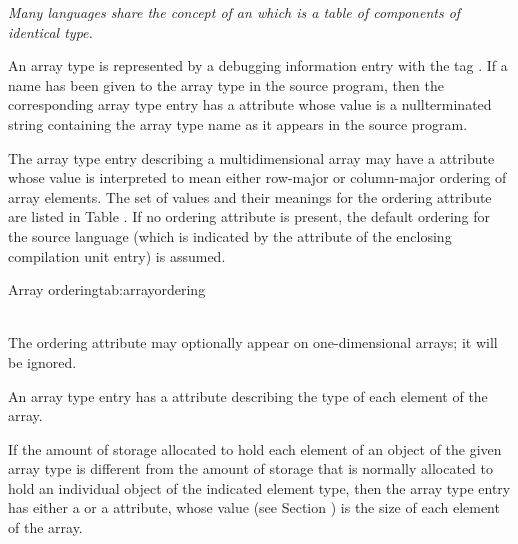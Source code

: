 \textit{Many languages share the concept of an  which is
a table of components of identical type.}

An array type is represented by a debugging information entry
with the tag \DWTAGarraytypeTARG. 
If a name has been given to
the array type in the source program, then the corresponding
array type entry has a \DWATname{} attribute 
whose value is a
null\dash terminated string containing the array type name as it
appears in the source program.

The 
\hypertarget{chap:DWATorderingarrayrowcolumnordering}{}
array type entry describing a multidimensional array may
have a \DWATordering{} attribute whose 
 value is
interpreted to mean either row-major or column-major ordering
of array elements. The set of values and their meanings
for the ordering attribute are listed in 
Table . 
If no
ordering attribute is present, the default ordering for the
source language (which is indicated by the 
\DWATlanguage{}
attribute 
of the enclosing compilation unit entry) is assumed.

\begin{simplenametable}[1.8in]{Array ordering}{tab:arrayordering}
\DWORDcolmajorTARG{} \\
\DWORDrowmajorTARG{} \\
\end{simplenametable}

The ordering attribute may optionally appear on one-dimensional
arrays; it will be ignored.

An array type entry has 
a \DWATtype{} attribute
describing
the type of each element of the array.

If the amount of storage allocated to hold each element of an
object of the given array type is different from the amount
of storage that is normally allocated to hold an individual
\hypertarget{chap:DWATbitstridearrayelementstrideofarraytype}{}
object of the 
\hypertarget{chap:DWATbytestridearrayelementstrideofarraytype}{}
indicated element type, then the array type
entry has either a 
\DWATbytestride{} 
or 
a \DWATbitstride{}
attribute, 
whose value 
(see Section ) 
is the size of each
element of the array.


